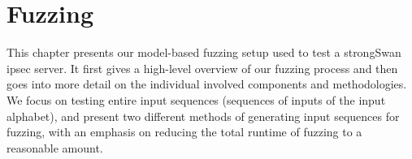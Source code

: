 %
%
% 

\chapter{Fuzzing}

\label{chap:Fuzzing}

\iffalse
\section{Environment Setup} \label{sec:fuzzenv}
We ran all our fuzzing tests in the same virtual network setup we used for our automata learning, on the same Ubuntu 22.04 LTS distributions. We again designated one \ac{vm} as the initiator which would send the fuzzed messages and the other one as the responder to create a typical client-server setup. All settings on the used VMs remained the same as while learning to ensure that no discrepancies were introduced by different environment settings. The \ac{sut} was also the same strongSwan server used for learning. The major difference to learning is that for fuzzing, we no longer require \textsc{AALpy}. Our only real dependency, apart from our mapper class, is the Python fuzzing framework boofuzz, version 0.4.1, which we use for input generation. 
\fi

This chapter presents our model-based fuzzing setup used to test a strongSwan \ac{ipsec} server. It first gives a high-level overview of our fuzzing process and then goes into more detail on the individual involved components and methodologies. We focus on testing entire input sequences (sequences of inputs of the input alphabet), and present two different methods of generating input sequences for fuzzing, with an emphasis on reducing the total runtime of fuzzing to a reasonable amount.

